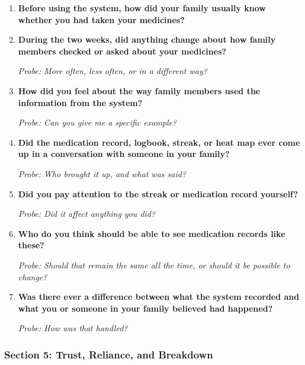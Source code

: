 \begin{enumerate}[resume]
  \item \textbf{Before using the system, how did your family usually know whether you had taken your medicines?}
  \item \textbf{During the two weeks, did anything change about how family members checked or asked about your medicines?}

  \textit{Probe: More often, less often, or in a different way?}
  \item \textbf{How did you feel about the way family members used the information from the system?}

  \textit{Probe: Can you give me a specific example?}
  \item \textbf{Did the medication record, logbook, streak, or heat map ever come up in a conversation with someone in your family?}

  \textit{Probe: Who brought it up, and what was said?}
  \item \textbf{Did you pay attention to the streak or medication record yourself?}

  \textit{Probe: Did it affect anything you did?}
  \item \textbf{Who do you think should be able to see medication records like these?}

  \textit{Probe: Should that remain the same all the time, or should it be possible to change?}
  \item \textbf{Was there ever a difference between what the system recorded and what you or someone in your family believed had happened?}

  \textit{Probe: How was that handled?}
\end{enumerate}

\subsubsection{Section 5: Trust, Reliance, and Breakdown}

